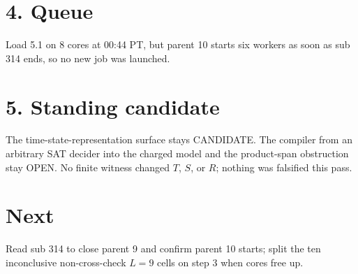 \documentclass[11pt]{article}
\begin{document}
\section*{4. Queue}
Load 5.1 on 8 cores at 00:44 PT, but parent 10 starts six workers as soon as sub 314 ends, so no new job was launched.

\section*{5. Standing candidate}
The time-state-representation surface stays CANDIDATE. The compiler from an arbitrary SAT decider into the charged model and the product-span obstruction stay OPEN. No finite witness changed $T$, $S$, or $R$; nothing was falsified this pass.

\section*{Next}
Read sub 314 to close parent 9 and confirm parent 10 starts; split the ten inconclusive non-cross-check $L=9$ cells on step 3 when cores free up.
\end{document}
